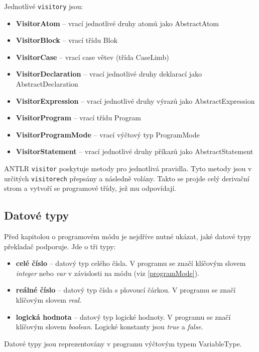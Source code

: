 \documentclass[
12pt,
a4paper,
pdftex,
czech,
titlepage
]{report}
\begin{document}
	Jednotlivé \texttt{visitory} jsou:
	 
	\begin{itemize}
	\item \textbf{VisitorAtom} -- vrací jednotlivé druhy atomů jako AbstractAtom
	\item \textbf{VisitorBlock} -- vrací třídu Blok
	\item \textbf{VisitorCase} -- vrací case větev (třída CaseLimb)
	\item \textbf{VisitorDeclaration} -- vrací jednotlivé druhy deklarací jako AbstractDeclaration
	\item \textbf{VisitorExpression} -- vrací jednotlivé druhy výrazů jako AbstractExpression
	\item \textbf{VisitorProgram} -- vrací třídu Program
	\item \textbf{VisitorProgramMode} -- vrací výčtový typ ProgramMode
	\item \textbf{VisitorStatement} -- vrací jednotlivé druhy příkazů jako AbstractStatement
	 \end{itemize} 
	 
ANTLR \texttt{visitor} poskytuje metody pro jednotlivá pravidla. Tyto metody jsou v určitých \texttt{visitorech} přepsány a následně volány. Takto se projde celý derivační strom a vytvoří se programové třídy, jež mu odpovídají.	
 
\subsection{Datové typy}
Před kapitolou o programovém módu je nejdříve nutné ukázat, jaké datové typy překladač podporuje. Jde o tři typy:
\begin{itemize}
\item \textbf{celé číslo} -- datový typ celého čísla. V programu se značí klíčovým slovem \textit{integer} nebo \textit{var} v závislosti na módu (viz \ref{programMode}). 
\item \textbf{reálné číslo} -- datový typ čísla s plovoucí čárkou. V programu se značí klíčovým slovem \textit{real}.
\item \textbf{logická hodnota} -- datový typ logické hodnoty. V programu se značí klíčovým slovem \textit{boolean}. Logické konstanty jsou \textit{true} a \textit{false}. 
\end{itemize} 

Datové typy jsou reprezentovány v programu výčtovým typem VariableType.
 
\end{document}
